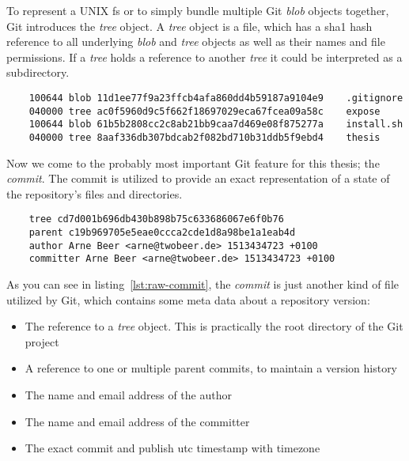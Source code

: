 To represent a UNIX \ac{fs} or to simply bundle multiple Git \emph{blob} objects together, Git introduces the \emph{tree} object.
A \emph{tree} object is a file, which has a \ac{sha1} hash reference to all underlying \emph{blob} and \emph{tree} objects as well as their names and file permissions.
If a \emph{tree} holds a reference to another \emph{tree} it could be interpreted as a subdirectory.

\begin{verbatim}
    100644 blob 11d1ee77f9a23ffcb4afa860dd4b59187a9104e9	.gitignore
    040000 tree ac0f5960d9c5f662f18697029eca67fcea09a58c	expose
    100644 blob 61b5b2808cc2c8ab21bb9caa7d469e08f875277a	install.sh
    040000 tree 8aaf336db307bdcab2f082bd710b31ddb5f9ebd4	thesis
\end{verbatim}
\begingroup
{}
\endgroup

Now we come to the probably most important Git feature for this thesis; the \emph{commit}.
The commit is utilized to provide an exact representation of a state of the repository's files and directories.

\begin{verbatim}
    tree cd7d001b696db430b898b75c633686067e6f0b76
    parent c19b969705e5eae0ccca2cde1d8a98be1a1eab4d
    author Arne Beer <arne@twobeer.de> 1513434723 +0100
    committer Arne Beer <arne@twobeer.de> 1513434723 +0100
\end{verbatim}
\begingroup
{}
\endgroup

As you can see in listing~\ref{lst:raw-commit}, the \emph{commit} is just another kind of file utilized by Git, which contains some meta data about a repository version:

\begin{itemize}
    \item The reference to a \emph{tree} object. This is practically the root directory of the Git project
    \item A reference to one or multiple parent commits, to maintain a version history
    \item The name and email address of the author
    \item The name and email address of the committer
    \item The exact commit and publish \ac{utc} timestamp with timezone
\end{itemize}

